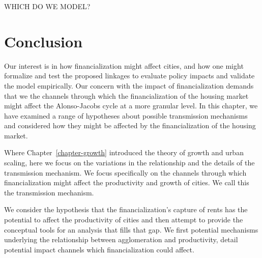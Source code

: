 WHICH DO WE MODEL?

\section{Conclusion}
Our interest is in how financialization might affect cities, and how one might formalize and test the proposed linkages to evaluate policy impacts and validate the model empirically.
Our concern with the impact of financialization demands that we the channels through which the financialization of the housing market might affect the Alonso-Jacobs cycle at a more granular level.
In this chapter, we have examined a range of hypotheses about possible transmission mechanisms and considered how they might be affected by the financialization of the housing market.

Where Chapter~\ref{chapter-growth} introduced the theory of growth and urban scaling, here we focus on the variations in the relationship and the details of the transmission mechanism. We focus specifically on the channels through which financialization might affect the productivity and growth of cities. We call this the \gls{transmission mechanism}.
 
We consider the hypothesis that the financialization's capture of rents has the potential to affect the productivity of cities and then attempt to provide the conceptual tools for an analysis that fills that gap. We first potential mechanisms underlying the relationship between agglomeration and productivity, detail potential impact channels which financialization could affect. 




